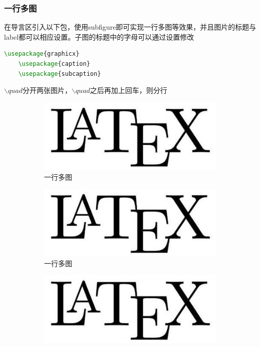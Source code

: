 \subsubsection{一行多图}
在导言区引入以下包，使用subfigure即可实现一行多图等效果，并且图片的标题与label都可以相应设置。子图的标题中的字母可以通过设置修改
\begin{lstlisting}[language={TeX}]
    \usepackage{graphicx}
    \usepackage{caption}
    \usepackage{subcaption}
\end{lstlisting}
$\backslash quad$分开两张图片，$\backslash quad$之后再加上回车，则分行

\begin{figure}[htbp]
    \centering
    \begin{subfigure}[t]{0.2\linewidth}
        \includegraphics[width=\linewidth]{figure/Latex.jpg}
        \caption{一行多图}
        \label{fig:myfig2}
    \end{subfigure}
    \quad
    \begin{subfigure}[t]{0.2\linewidth}
        \includegraphics[width=\linewidth]{figure/Latex.jpg}
        \caption{一行多图}
        \label{fig:myfig3}
    \end{subfigure}
    \quad
    \begin{subfigure}[t]{0.2\linewidth}
        \includegraphics[width=\linewidth]{figure/Latex.jpg}

\end{subfigure}
\end{figure}
